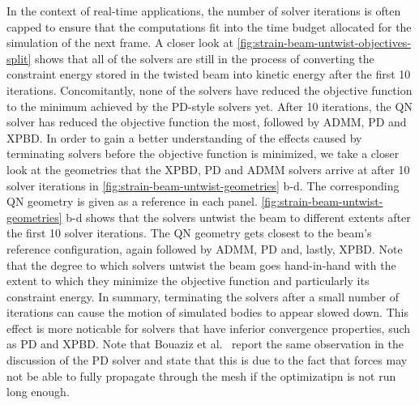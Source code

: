 In the context of real-time applications, the number of solver iterations is often capped to ensure that the computations fit into the time budget allocated 
for the simulation of the next frame. A closer look at \autoref{fig:strain-beam-untwist-objectives-split} shows that all of the solvers are still in the process of 
converting the constraint energy stored in the twisted beam into kinetic energy after the first 10 iterations. Concomitantly, none of the solvers have reduced the 
objective function to the minimum achieved by the PD-style solvers yet. After 10 iterations, the QN solver has reduced the objective function the most, followed by 
ADMM, PD and XPBD. In order to gain a better understanding of the effects caused by terminating solvers before the objective function is minimized, we take a 
closer look at the geometries that the XPBD, PD and ADMM solvers arrive at after 10 solver iterations in \autoref{fig:strain-beam-untwist-geometries} b-d. The 
corresponding QN geometry is given as a reference in each panel. \autoref{fig:strain-beam-untwist-geometries} b-d shows that the solvers untwist the beam to 
different extents after the first 10 solver iterations. The QN geometry gets closest to the beam's reference configuration, again followed by ADMM, PD and, lastly, 
XPBD. Note that the degree to which solvers untwist the beam goes hand-in-hand with the extent to which they minimize the objective function and particularly its 
constraint energy. In summary, terminating the solvers after a small number of iterations can cause the motion of simulated bodies to appear slowed down. 
This effect is more noticable for solvers that have inferior convergence properties, such as PD and XPBD. Note that Bouaziz et al.\ \cite{bouaziz2014} report 
the same observation in the discussion of the PD solver and state that this is due to the fact that forces may not be able to fully propagate through the mesh 
if the optimizatipn is not run long enough. 

